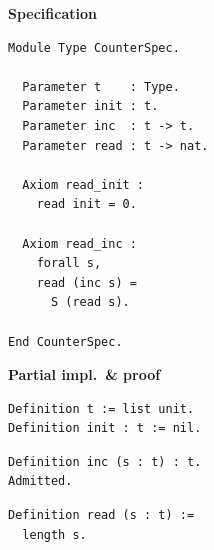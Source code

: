 
\begin{figure}[tb]
\centering
{}
\begin{minipage}[t]{0.32\textwidth}
\centering
\textbf{Specification}\\[2pt]
\begin{lstlisting}
Module Type CounterSpec.

  Parameter t    : Type.
  Parameter init : t.
  Parameter inc  : t -> t.
  Parameter read : t -> nat.

  Axiom read_init :
    read init = 0.

  Axiom read_inc :
    forall s,
    read (inc s) =
      S (read s).

End CounterSpec.
\end{lstlisting}
\end{minipage}\hfill
\begin{minipage}[t]{0.32\textwidth}
\centering
\textbf{Partial impl.\ \& proof}\\[2pt]
\begin{lstlisting}
Definition t := list unit.
Definition init : t := nil.
\end{lstlisting}
\begin{lstlisting}[backgroundcolor=\color{partialhi}]
Definition inc (s : t) : t.
Admitted.
\end{lstlisting}
\begin{lstlisting}
Definition read (s : t) :=
  length s.


\end{lstlisting}
\end{minipage}
\end{figure}
